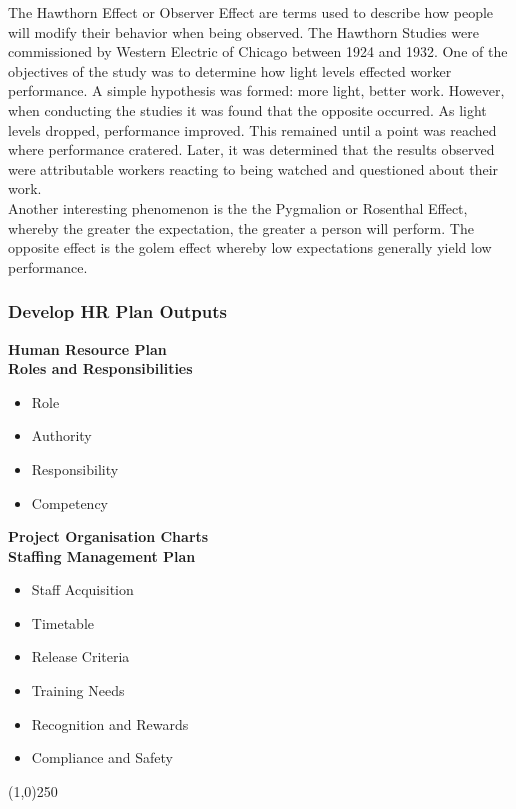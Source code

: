 The Hawthorn Effect or Observer Effect are terms used to describe how people will modify their behavior when being observed.  The Hawthorn Studies were commissioned by Western Electric of Chicago between 1924 and 1932.  One of the objectives of the study was to determine how light levels effected worker performance.  A simple hypothesis was formed: more light, better work.  However, when conducting the studies it was found that the opposite occurred.  As light levels dropped, performance improved. This remained until a point was reached where performance cratered.  Later, it was determined that the results observed were attributable workers reacting to being watched and questioned about their work. \\

Another interesting phenomenon is the the Pygmalion or Rosenthal Effect, whereby the greater the expectation, the greater a person will perform.  The opposite effect is the golem effect whereby low expectations generally yield low performance. 


 
\begin{frame}
\frametitle{Develop HR Plan \hfill Outputs}
\textbf{Human Resource Plan}\\
\textbf{Roles and Responsibilities}\\
	\begin{itemize}
		\item Role
		\item Authority
		\item Responsibility
		\item Competency
	\end{itemize}
\textbf{Project Organisation Charts}\\
\textbf{Staffing Management Plan}\\
	\begin{itemize}
		\item Staff Acquisition
		\item Timetable
		\item Release Criteria
		\item Training Needs
		\item Recognition and Rewards
		\item Compliance and Safety
	\end{itemize}
\end{frame}\begin{center}\line(1,0){250}\end{center}
 
 

